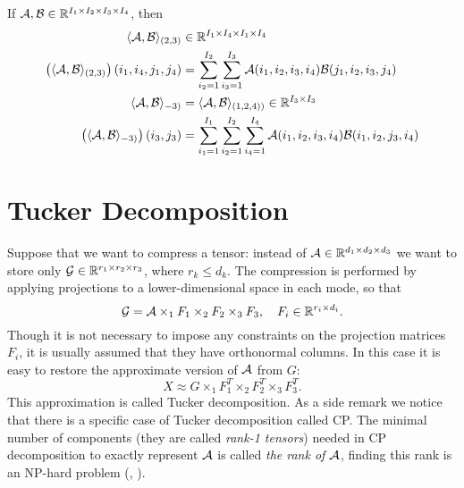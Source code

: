 If $\mathcal{A}, \mathcal{B} \in \mathbb{R}^{I_1 \times I_2 \times I_3 \times I_4}$, then
\begin{eqnarray*}
\begin{split}
\langle \mathcal{A}, \mathcal{B} \rangle_{(2,3)} & \in \mathbb{R}^{I_1 \times I_4 \times I_1 \times I_4} \\
\left( \langle \mathcal{A}, \mathcal{B} \rangle_{(2,3)}\right)(i_1, i_4, j_1, j_4) &= \sum_{i_2 = 1}^{I_2} \sum_{i_3 = 1}^{I_3} \mathcal{A}(i_1, i_2, i_3, i_4) \mathcal{B}(j_1, i_2, i_3, j_4) \\
\langle \mathcal{A}, \mathcal{B} \rangle_{-3)} &= \langle \mathcal{A}, \mathcal{B} \rangle_{(1,2,4))} \in \mathbb{R}^{I_3 \times I_3} \\
\left( \langle \mathcal{A}, \mathcal{B} \rangle_{-3)}\right)(i_3, j_3) &= \sum_{i_1 =1 }^{I_1} \sum_{i_2 = 1}^{I_2} \sum_{i_4 = 1}^{I_4} \mathcal{A}(i_1, i_2, i_3, i_4) \mathcal{B}(i_1, i_2, j_3, i_4) 
\end{split}
\end{eqnarray*}


\section{Tucker Decomposition}


Suppose that we want to compress a tensor: instead of $\mathcal{A} \in \mathbb{R}^{d_1 \times d_2 \times d_3}$
we want to store only $\mathcal{G} \in \mathbb{R}^{r_1 \times r_2 \times r_3}$, where $r_k \leq d_k$.
The compression is performed by applying projections to a lower-dimensional
space in each mode, so that
\begin{equation}
    \mathcal{G} = \mathcal{A} \times_1 F_1 \times_2 F_2 \times_3 F_3, \quad F_i \in \mathbb{R}^{r_i \times d_i}.
\end{equation}
Though it  is not necessary to impose any constraints on the  projection matrices $F_i$,
it is usually assumed that they have orthonormal columns. In this case it is
easy to restore the approximate version of $\mathcal{A}$ from $G$:
\begin{equation}
    X \approx G \times _{1} F_1^T \times _{2} F_2^T \times _{3} F_3^T.
\end{equation}
This approximation is called Tucker decomposition. 
As a side remark we notice that there is a specific case of Tucker decomposition
called CP. The minimal number of components (they are called \textit{rank-1 tensors}) needed
in CP decomposition to exactly represent $\mathcal{A}$ is called \textit{the rank of $\mathcal{A}$},
finding this rank is an NP-hard problem (\cite{tensor_rank_np_complete}, \cite{tensors_np_hard}).



